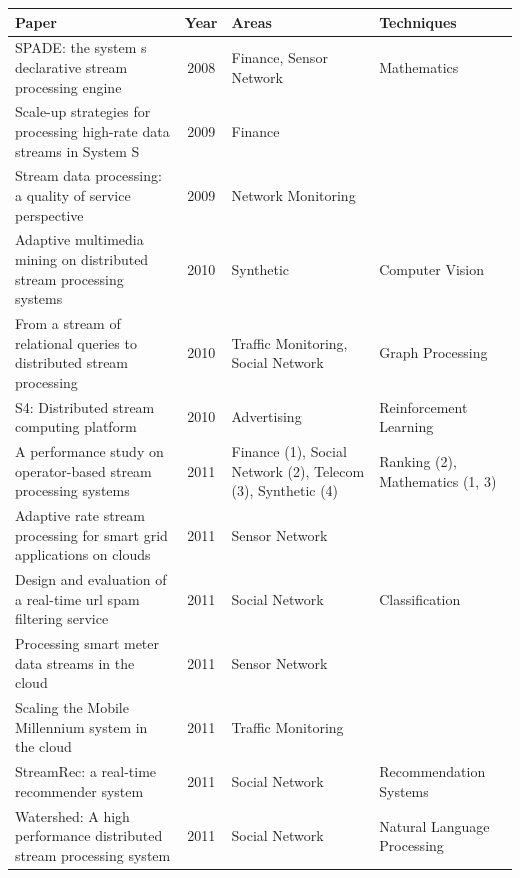 \documentclass[ppgc,diss,english]{iiufrgs}
\begin{document}
\begin{center}
	\footnotesize
	\begin{longtable}{ | p{8cm} | c | p{3cm} | p{2.5cm} |}
   		\hline
		\textbf{Paper} & \textbf{Year} & \textbf{Areas} & \textbf{Techniques} \\\hline
		
		SPADE: the system s declarative stream processing engine \cite{gedik2008spade} & 2008 & Finance, Sensor Network & Mathematics \\\hline
		Scale-up strategies for processing high-rate data streams in System S \cite{andrade2009scale} & 2009 & Finance & \\\hline
		Stream data processing: a quality of service perspective \cite{chakravarthy2009stream} & 2009 & Network Monitoring & \\\hline
		Adaptive multimedia mining on distributed stream processing systems \cite{turaga2010adaptive} & 2010 & Synthetic & Computer Vision \\\hline
		From a stream of relational queries to distributed stream processing \cite{zou2010stream} & 2010 & Traffic Monitoring, Social Network & Graph Processing \\\hline
		S4: Distributed stream computing platform \cite{neumeyer2010s4} & 2010 & Advertising & Reinforcement Learning \\\hline
		A performance study on operator-based stream processing systems \cite{dayarathna2011performance} & 2011 & Finance (1), Social Network (2), Telecom (3), Synthetic (4) & Ranking (2), Mathematics (1, 3) \\\hline
		Adaptive rate stream processing for smart grid applications on clouds \cite{simmhan2011adaptive} & 2011 & Sensor Network & \\\hline
		Design and evaluation of a real-time url spam filtering service \cite{thomas2011design} & 2011 & Social Network & Classification \\\hline
		Processing smart meter data streams in the cloud \cite{lohrmann2011processing} & 2011 & Sensor Network & \\\hline
		Scaling the Mobile Millennium system in the cloud \cite{hunter2011scaling} & 2011 & Traffic Monitoring & \\\hline
		StreamRec: a real-time recommender system \cite{chandramouli2011streamrec} & 2011 & Social Network & Recommendation Systems \\\hline
		Watershed: A high performance distributed stream processing system \cite{de2011watershed} & 2011 & Social Network & Natural Language Processing \\\hline

\end{longtable}
\end{center}
\end{document}

